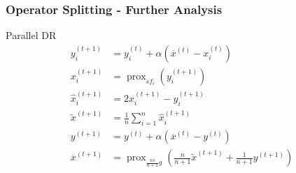 
\begin{frame}
\frametitle{Operator Splitting - Further Analysis}

\begin{block}{Parallel DR}
\ 
\vspace{-1.3em}
\begin{align*}
y_i^{(t+1)} & = y_i^{(t)} + \alpha (\overline{x}^{(t)} - x_i^{(t)}) \\
x_i^{(t+1)} & = \operatorname{prox}_{sf_i} (y_i^{(t+1)}) \\
\widehat{x}_i^{(t+1)} & = 2x_i^{(t+1)} - y_i^{(t+1)} \\
\widetilde{x}^{(t+1)} & = \frac{1}{n}\sum\nolimits_{i=1}^n \widehat{x}_i^{(t+1)} \\
y^{(t+1)} & =  y^{(t)} + \alpha (\overline{x}^{(t)} - y^{(t)}) \\
\overline{x}^{(t+1)} & = \operatorname{prox}_{\frac{ns}{n+1}g} \left( \frac{n}{n+1} \widetilde{x}^{(t+1)} + \frac{1}{n+1} y^{(t+1)} \right)
\end{align*}
\end{block}

\end{frame}


